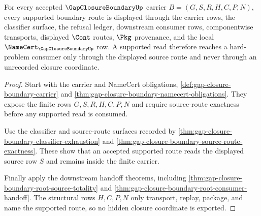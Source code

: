 \begin{theorem}
\label{thm:gap-closure-boundary-supported-route-totality}
For every accepted $\GapClosureBoundaryUp$ carrier $B=(G,S,R,H,C,P,N)$, every supported boundary route is displayed through the carrier rows, the classifier surface, the refusal ledger, downstream consumer rows, componentwise transports, displayed $\Cont$ routes, $\Pkg$ provenance, and the local $\NameCert_{\GapClosureBoundaryUp}$ row. A supported read therefore reaches a hard-problem consumer only through the displayed source route and never through an unrecorded closure coordinate.
\end{theorem}
\begin{proof}
Start with the carrier and NameCert obligations, \autoref{def:gap-closure-boundary-carrier} and \autoref{thm:gap-closure-boundary-namecert-obligations}. They expose the finite rows $G,S,R,H,C,P,N$ and require source-route exactness before any supported read is consumed.

Use the classifier and source-route surfaces recorded by \autoref{thm:gap-closure-boundary-classifier-exhaustion} and \autoref{thm:gap-closure-boundary-source-route-exactness}. These show that an accepted supported route reads the displayed source row $S$ and remains inside the finite carrier.

Finally apply the downstream handoff theorems, including \autoref{thm:gap-closure-boundary-root-source-totality} and \autoref{thm:gap-closure-boundary-root-consumer-handoff}. The structural rows $H,C,P,N$ only transport, replay, package, and name the supported route, so no hidden closure coordinate is exported.
\end{proof}

